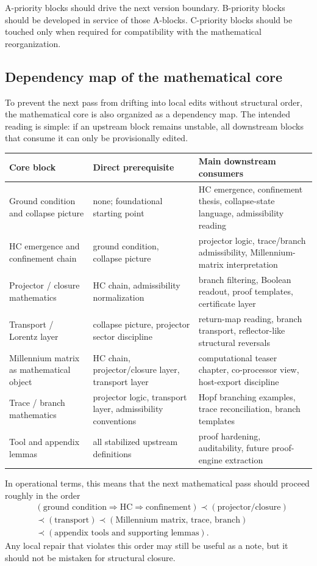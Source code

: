 \documentclass[12pt,a4paper]{article}
\begin{document}
A-priority blocks should drive the next version boundary. B-priority blocks should be developed in service of those A-blocks. C-priority blocks should be touched only when required for compatibility with the mathematical reorganization.

\subsection*{Dependency map of the mathematical core}
To prevent the next pass from drifting into local edits without structural order, the mathematical core is also organized as a dependency map. The intended reading is simple: if an upstream block remains unstable, all downstream blocks that consume it can only be provisionally edited.
\begin{center}
\begin{tabular}{P{0.28\textwidth}P{0.30\textwidth}P{0.30\textwidth}}
\toprule
\textbf{Core block} & \textbf{Direct prerequisite} & \textbf{Main downstream consumers}\\
\midrule
Ground condition and collapse picture & none; foundational starting point & HC emergence, confinement thesis, collapse-state language, admissibility reading\\
HC emergence and confinement chain & ground condition, collapse picture & projector logic, trace/branch admissibility, Millennium-matrix interpretation\\
Projector / closure mathematics & HC chain, admissibility normalization & branch filtering, Boolean readout, proof templates, certificate layer\\
Transport / Lorentz layer & collapse picture, projector sector discipline & return-map reading, branch transport, reflector-like structural reversals\\
Millennium matrix as mathematical object & HC chain, projector/closure layer, transport layer & computational teaser chapter, co-processor view, host-export discipline\\
Trace / branch mathematics & projector logic, transport layer, admissibility conventions & Hopf branching examples, trace reconciliation, branch templates\\
Tool and appendix lemmas & all stabilized upstream definitions & proof hardening, auditability, future proof-engine extraction\\
\bottomrule
\end{tabular}
\end{center}

In operational terms, this means that the next mathematical pass should proceed roughly in the order
\[
\begin{aligned}
&(\text{ground condition} \Rightarrow \text{HC} \Rightarrow \text{confinement}) \prec (\text{projector/closure})\\
&\prec (\text{transport}) \prec (\text{Millennium matrix, trace, branch})\\
&\prec (\text{appendix tools and supporting lemmas}).
\end{aligned}
\]
Any local repair that violates this order may still be useful as a note, but it should not be mistaken for structural closure.
\end{document}
